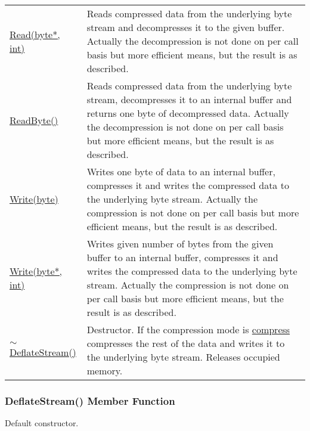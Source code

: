 \documentclass[a4paper,oneside,11.000000pt]{book}
\begin{document}
\begin{flushleft}
\begin{supertabular}[l]{!{\raggedright}p{7.575cm}!{\raggedright}p{7.575cm}}
\\
\hyperlink{System.IO.Compression.DeflateStream.Read.P.System.IO.Compression.DeflateStream.P.byte.int}{Read(byte*, int)}
& Reads compressed data from the underlying byte stream and decompresses it to the given buffer.
Actually the decompression is not done on per call basis but more efficient means, but
the result is as described.

\\
\hyperlink{System.IO.Compression.DeflateStream.ReadByte.P.System.IO.Compression.DeflateStream}{ReadByte()}
& Reads compressed data from the underlying byte stream, decompresses it to an internal buffer
and returns one byte of decompressed data.
Actually the decompression is not done on per call basis but more efficient means, but
the result is as described.

\\
\hyperlink{System.IO.Compression.DeflateStream.Write.P.System.IO.Compression.DeflateStream.byte}{Write(byte)}
& Writes one byte of data to an internal buffer, compresses it and writes the compressed data
to the underlying byte stream.
Actually the compression is not done on per call basis but more efficient means, but
the result is as described.

\\
\hyperlink{System.IO.Compression.DeflateStream.Write.P.System.IO.Compression.DeflateStream.P.byte.int}{Write(byte*, int)}
& Writes given number of bytes from the given buffer to an internal buffer,
compresses it and writes the compressed data to the underlying byte stream.
Actually the compression is not done on per call basis but more efficient means, but
the result is as described.

\\
\hyperlink{System.IO.Compression.DeflateStream.destructor.P.System.IO.Compression.DeflateStream}{$\sim$DeflateStream()}
& Destructor. If the compression mode is \hyperlink{System.IO.Compression.CompressionMode.compress}{compress} compresses the rest of the data
and writes it to the underlying byte stream. Releases occupied memory.

\\
\end{supertabular}

\end{flushleft}
\clearpage

\hypertarget{System.IO.Compression.DeflateStream.constructor.P.System.IO.Compression.DeflateStream}{\subsubsection*{DeflateStream() Member Function}}\begin{flushleft}
Default constructor.

\end{flushleft}
\end{document}
